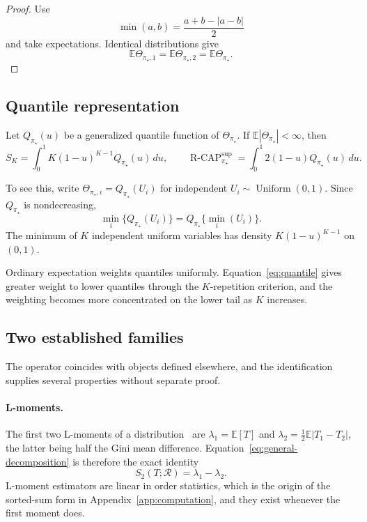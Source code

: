 \documentclass[11pt]{article}
\newcommand{\Regime}{\mathcal{R}}
\newcommand{\E}{\mathbb{E}}
\newcommand{\RCAP}{\operatorname{R\text{-}CAP}^{\mathrm{sup}}_{\pi_\star}}
\theoremstyle{remark}
\begin{document}
\begin{proof}
Use
\[
\min(a,b)=\frac{a+b-|a-b|}{2}
\]
and take expectations. Identical distributions give
\[
\E\Theta_{\pi_\star,1}
=
\E\Theta_{\pi_\star,2}
=
\E\Theta_{\pi_\star}.
\]
\end{proof}

\subsection{Quantile representation}

Let $Q_{\pi_\star}(u)$ be a generalized quantile function of $\Theta_{\pi_\star}$. If $\E|\Theta_{\pi_\star}|<\infty$, then
\begin{equation}
S_K
=
\int_0^1 K(1-u)^{K-1}Q_{\pi_\star}(u)\,du,
\qquad
\RCAP
=
\int_0^1 2(1-u)Q_{\pi_\star}(u)\,du.
\label{eq:quantile}
\end{equation}

To see this, write $\Theta_{\pi_\star,i}=Q_{\pi_\star}(U_i)$ for independent $U_i\sim\operatorname{Uniform}(0,1)$. Since $Q_{\pi_\star}$ is nondecreasing,
\[
\min_i\{Q_{\pi_\star}(U_i)\}
=
Q_{\pi_\star}\{\min_i(U_i)\}.
\]
The minimum of $K$ independent uniform variables has density $K(1-u)^{K-1}$ on $(0,1)$.

Ordinary expectation weights quantiles uniformly. Equation~\eqref{eq:quantile} gives greater weight to lower quantiles through the $K$-repetition criterion, and the weighting becomes more concentrated on the lower tail as $K$ increases.

\subsection{Two established families}
\label{app:families}

The operator coincides with objects defined elsewhere, and the identification supplies several properties without separate proof.

\paragraph{L-moments.}
The first two L-moments of a distribution~\cite{hosking1990lmoments} are $\lambda_1=\E[T]$ and $\lambda_2=\tfrac12\E|T_1-T_2|$, the latter being half the Gini mean difference. Equation~\eqref{eq:general-decomposition} is therefore the exact identity
\[
S_2(T;\Regime)=\lambda_1-\lambda_2 .
\]
L-moment estimators are linear in order statistics, which is the origin of the sorted-sum form in Appendix~\ref{app:computation}, and they exist whenever the first moment does.
\end{document}
